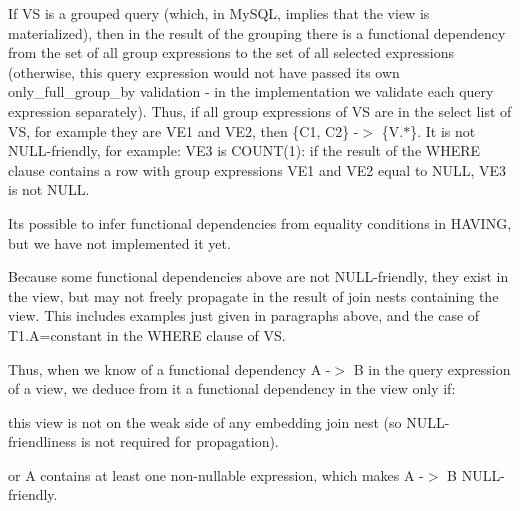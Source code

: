 If VS is a grouped query (which, in My\+S\+QL, implies that the view is materialized), then in the result of the grouping there is a functional dependency from the set of all group expressions to the set of all selected expressions (otherwise, this query expression would not have passed its own only\+\_\+full\+\_\+group\+\_\+by validation -\/ in the implementation we validate each query expression separately). Thus, if all group expressions of VS are in the select list of VS, for example they are V\+E1 and V\+E2, then \{C1, C2\} -\/$>$ \{V.$\ast$\}. It is not N\+U\+LL-\/friendly, for example\+: V\+E3 is C\+O\+U\+N\+T(1)\+: if the result of the W\+H\+E\+RE clause contains a row with group expressions V\+E1 and V\+E2 equal to N\+U\+LL, V\+E3 is not N\+U\+LL.

It\textquotesingle{}s possible to infer functional dependencies from equality conditions in H\+A\+V\+I\+NG, but we have not implemented it yet.

Because some functional dependencies above are not N\+U\+LL-\/friendly, they exist in the view, but may not freely propagate in the result of join nests containing the view. This includes examples just given in paragraphs above, and the case of T1.\+A=constant in the W\+H\+E\+RE clause of VS.

Thus, when we know of a functional dependency A -\/$>$ B in the query expression of a view, we deduce from it a functional dependency in the view only if\+:
\begin{DoxyItemize}
\item this view is not on the weak side of any embedding join nest (so N\+U\+LL-\/friendliness is not required for propagation).
\item or A contains at least one non-\/nullable expression, which makes A -\/$>$ B N\+U\+LL-\/friendly.
\end{DoxyItemize}

